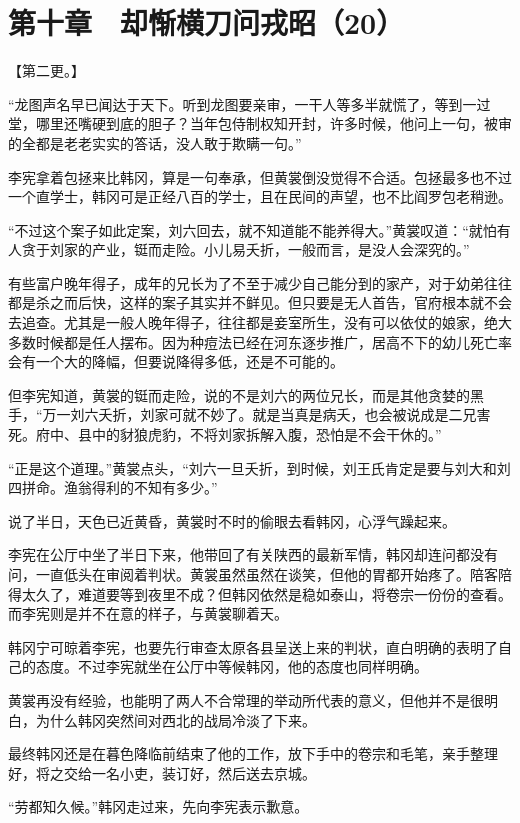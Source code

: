 \section{第十章　却惭横刀问戎昭（20）}

【第二更。】

“龙图声名早已闻达于天下。听到龙图要亲审，一干人等多半就慌了，等到一过堂，哪里还嘴硬到底的胆子？当年包侍制权知开封，许多时候，他问上一句，被审的全都是老老实实的答话，没人敢于欺瞒一句。”

李宪拿着包拯来比韩冈，算是一句奉承，但黄裳倒没觉得不合适。包拯最多也不过一个直学士，韩冈可是正经八百的学士，且在民间的声望，也不比阎罗包老稍逊。

“不过这个案子如此定案，刘六回去，就不知道能不能养得大。”黄裳叹道：“就怕有人贪于刘家的产业，铤而走险。小儿易夭折，一般而言，是没人会深究的。”

有些富户晚年得子，成年的兄长为了不至于减少自己能分到的家产，对于幼弟往往都是杀之而后快，这样的案子其实并不鲜见。但只要是无人首告，官府根本就不会去追查。尤其是一般人晚年得子，往往都是妾室所生，没有可以依仗的娘家，绝大多数时候都是任人摆布。因为种痘法已经在河东逐步推广，居高不下的幼儿死亡率会有一个大的降幅，但要说降得多低，还是不可能的。

但李宪知道，黄裳的铤而走险，说的不是刘六的两位兄长，而是其他贪婪的黑手，“万一刘六夭折，刘家可就不妙了。就是当真是病夭，也会被说成是二兄害死。府中、县中的豺狼虎豹，不将刘家拆解入腹，恐怕是不会干休的。”

“正是这个道理。”黄裳点头，“刘六一旦夭折，到时候，刘王氏肯定是要与刘大和刘四拼命。渔翁得利的不知有多少。”

说了半日，天色已近黄昏，黄裳时不时的偷眼去看韩冈，心浮气躁起来。

李宪在公厅中坐了半日下来，他带回了有关陕西的最新军情，韩冈却连问都没有问，一直低头在审阅着判状。黄裳虽然虽然在谈笑，但他的胃都开始疼了。陪客陪得太久了，难道要等到夜里不成？但韩冈依然是稳如泰山，将卷宗一份份的查看。而李宪则是并不在意的样子，与黄裳聊着天。

韩冈宁可晾着李宪，也要先行审查太原各县呈送上来的判状，直白明确的表明了自己的态度。不过李宪就坐在公厅中等候韩冈，他的态度也同样明确。

黄裳再没有经验，也能明了两人不合常理的举动所代表的意义，但他并不是很明白，为什么韩冈突然间对西北的战局冷淡了下来。

最终韩冈还是在暮色降临前结束了他的工作，放下手中的卷宗和毛笔，亲手整理好，将之交给一名小吏，装订好，然后送去京城。

“劳都知久候。”韩冈走过来，先向李宪表示歉意。

